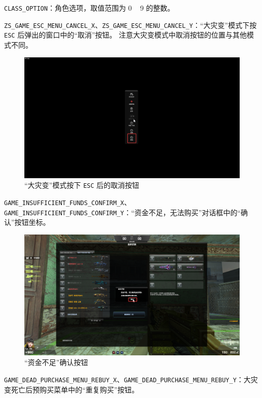 \lstinline{CLASS_OPTION}：角色选项，取值范围为 0 ~ 9 的整数。

\lstinline{ZS_GAME_ESC_MENU_CANCEL_X}、\lstinline{ZS_GAME_ESC_MENU_CANCEL_Y}：“大灾变”模式下按 \lstinline{ESC} 后弹出的窗口中的“取消”按钮。
注意大灾变模式中取消按钮的位置与其他模式不同。

\begin{figure}[H]
    \Centering
    \includegraphics[width=\textwidth]{docs/assets/zs_esc_cancel.png}
    \caption{“大灾变”模式按下 \lstinline{ESC} 后的取消按钮}
\end{figure}

\lstinline{GAME_INSUFFICIENT_FUNDS_CONFIRM_X}、\lstinline{GAME_INSUFFICIENT_FUNDS_CONFIRM_Y}：“资金不足，无法购买”对话框中的“确认”按钮坐标。

\begin{figure}[H]
    \Centering
    \includegraphics[width=\textwidth]{docs/assets/game_insuff_funds_confirm.png}
    \caption{“资金不足”确认按钮}
\end{figure}

\lstinline{GAME_DEAD_PURCHASE_MENU_REBUY_X}、\lstinline{GAME_DEAD_PURCHASE_MENU_REBUY_Y}：大灾变死亡后预购买菜单中的“重复购买”按钮。

